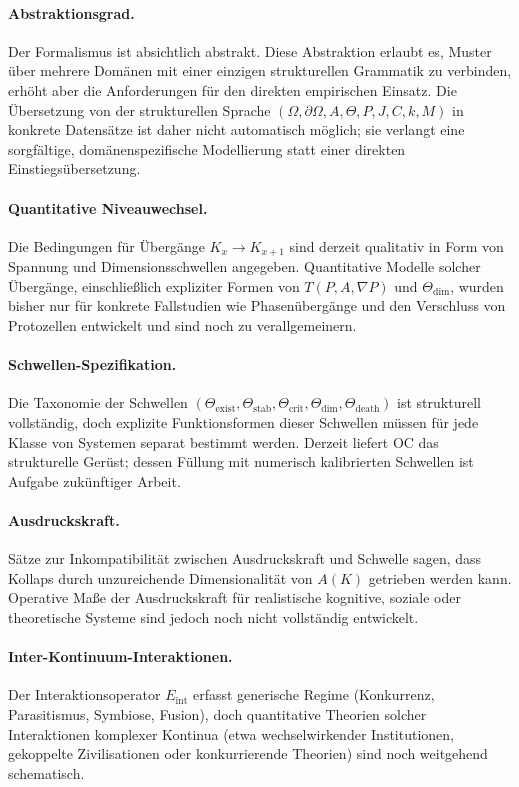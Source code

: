 \paragraph{Abstraktionsgrad.}
Der Formalismus ist absichtlich abstrakt. Diese Abstraktion erlaubt es,
Muster über mehrere Domänen mit einer einzigen strukturellen Grammatik zu
verbinden, erhöht aber die Anforderungen für den direkten empirischen Einsatz.
Die Übersetzung von der strukturellen Sprache
\((\Omega,\partial\Omega,A,\Theta,P,J,C,k,M)\)
in konkrete Datensätze ist daher nicht automatisch möglich; sie verlangt eine
sorgfältige, domänenspezifische Modellierung statt einer direkten
Einstiegsübersetzung.

\paragraph{Quantitative Niveauwechsel.}
Die Bedingungen für Übergänge \(K_x \to K_{x+1}\) sind derzeit qualitativ in
Form von Spannung und Dimensionsschwellen angegeben.
Quantitative Modelle solcher Übergänge, einschließlich expliziter Formen von
\(T(P,A,\nabla P)\) und \(\Theta_{\mathrm{dim}}\), wurden bisher nur für
konkrete Fallstudien wie Phasenübergänge und den Verschluss von Protozellen
entwickelt und sind noch zu verallgemeinern.

\paragraph{Schwellen-Spezifikation.}
Die Taxonomie der Schwellen
\((\Theta_{\mathrm{exist}}, \Theta_{\mathrm{stab}}, \Theta_{\mathrm{crit}}, \Theta_{\mathrm{dim}}, \Theta_{\mathrm{death}})\)
ist strukturell vollständig, doch explizite Funktionsformen dieser
Schwellen müssen für jede Klasse von Systemen separat bestimmt werden.
Derzeit liefert OC das strukturelle Gerüst; dessen Füllung mit numerisch
kalibrierten Schwellen ist Aufgabe zukünftiger Arbeit.

\paragraph{Ausdruckskraft.}
Sätze zur Inkompatibilität zwischen Ausdruckskraft und Schwelle sagen, dass
Kollaps durch unzureichende Dimensionalität von \(A(K)\) getrieben werden kann.
Operative Maße der Ausdruckskraft für realistische kognitive, soziale oder theoretische Systeme sind jedoch noch nicht vollständig entwickelt.

\paragraph{Inter-Kontinuum-Interaktionen.}
Der Interaktionsoperator \(E_{\mathrm{int}}\) erfasst generische Regime
(Konkurrenz, Parasitismus, Symbiose, Fusion), doch quantitative Theorien solcher
Interaktionen komplexer Kontinua (etwa wechselwirkender Institutionen,
gekoppelte Zivilisationen oder konkurrierende Theorien) sind noch weitgehend
schematisch.

